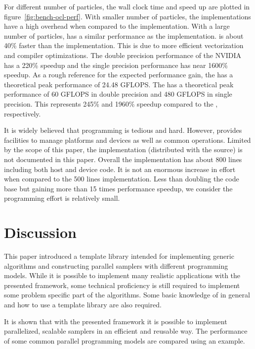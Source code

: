 \documentclass[11pt, fontset=Minion, showoverfull,
bib, mintcode, minted=cache]{marticle}
\begin{document}
For different number of particles, the wall clock time and speed up are
plotted in figure~\ref{fig:bench-ocl-perf}. With smaller number of particles,
the \lopencl implementations have a high overhead when compared to the \ltbb
implementation. With a large number of particles, \laocl has a similar
performance as the \ltbb implementation. \liocl is about 40\% faster than the
\ltbb implementation. This is due to more efficient vectorization and compiler
optimizations. The double precision performance of the NVIDIA \gpu has a 220\%
speedup and the single precision performance has near 1600\% speedup. As a
rough reference for the expected performance gain, the \cpu has a theoretical
peak performance of 24.48 GFLOPS. The \gpu has a theoretical peak performance
of 60 GFLOPS in double precision and 480 GFLOPS in single precision. This
represents 245\% and 1960\% speedup compared to the \cpu, respectively.

It is widely believed that \lopencl programming is tedious and hard. However,
\vsmc provides facilities to manage \lopencl platforms and devices as well as
common operations. Limited by the scope of this paper, the \lopencl
implementation (distributed with the \vsmc source) is not documented in this
paper. Overall the \lopencl implementation has about 800 lines including both
host and device code. It is not an enormous increase in effort when compared
to the 500 lines \smp implementation. Less than doubling the code base but
gaining more than 15 times performance speedup, we consider the programming
effort is relatively small.

\section{Discussion}
\label{sec:Discussion}

This paper introduced a \cpp template library intended for implementing
generic \smc algorithms and constructing parallel samplers with different
programming models. While it is possible to implement many realistic
applications with the presented framework, some technical proficiency is still
required to implement some problem specific part of the algorithms. Some basic
knowledge of \cpp in general and how to use a template library are also
required.

It is shown that with the presented framework it is possible to implement
parallelized, scalable \smc samplers in an efficient and reusable way. The
performance of some common parallel programming models are compared using an
example.
\end{document}
